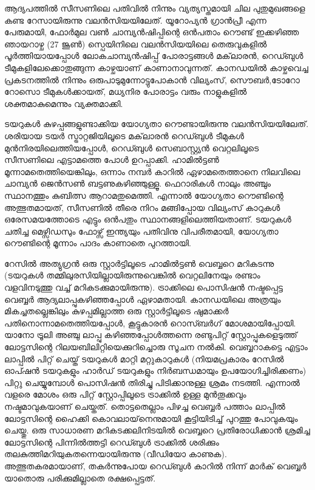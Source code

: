 \vskip 2pt

ആദ്യപത്തില്‍ സീസണിലെ പതിവില്‍ നിന്നും വ്യത്യസ്തമായി ചില പുതുമുഖങ്ങളെ കണ്ട റേസായിരുന്നു വലന്‍സിയയിലേത്. 
യൂറോപ്യന്‍ ഗ്രാന്‍പ്രീ എന്ന പേരുമായി, ഫോര്‍മുല വണ്‍ ചാമ്പ്യന്‍ഷിപ്പിന്റെ ഒന്‍പതാം റൌണ്ട് ഇക്കഴിഞ്ഞ ഞായറാഴ്ച (27
ജൂണ്‍) സ്പെയിനിലെ വലന്‍സിയയിലെ തെരുവുകളില്‍ പൂര്‍ത്തിയായപ്പോള്‍ ലോകചാമ്പ്യന്‍ഷിപ്പ് പോരാട്ടങ്ങള്‍ മക്‌ലാരന്‍,
റെഡ്ബുള്‍ ടീമുകളിലേക്കൊതുങ്ങുന്ന കാഴ്ചയാണ് കാണാനാവുന്നത്. കാനഡയില്‍ കാഴ്ചവെച്ച പ്രകടനത്തില്‍ നിന്നും 
ഒരുപാടുമുന്നോട്ടുപോകാന്‍ വില്യംസ്, സൌബര്‍,ടോറോ റോസൊ ടീമുകള്‍ക്കായത്, മധ്യനിര പോരാട്ടം വരും നാളുകളില്‍
ശക്തമാകുമെന്നും വ്യക്തമാക്കി.

ടയറുകള്‍ കുഴപ്പങ്ങളുണ്ടാക്കിയ യോഗ്യതാ റൌണ്ടായിരുന്നു വലന്‍സിയയിലേത്. ശരിയായ ടയര്‍ സ്ട്രാറ്റജിയിലൂടെ മക്‌ലാരന്‍
റെഡ്ബുള്‍ ടീമുകള്‍ മുന്‍നിരയിലെത്തിയപ്പോള്‍, റെഡ്ബുള്‍ സെബാസ്റ്റ്യന്‍ വെറ്റലിലൂടെ സീസണിലെ എട്ടാമത്തെ പോള്‍ 
ഉറപ്പാക്കി. ഹാമില്‍ട്ടണ്‍ മൂന്നാമതെത്തിയെങ്കിലും, ഒന്നാം നമ്പര്‍ കാറില്‍ ഏഴാമതെത്താനെ നിലവിലെ ചാമ്പ്യന്‍ ജെന്‍സണ്‍
ബട്ടണുകഴിഞ്ഞുള്ളൂ. ഫെറാരികള്‍ നാലും അഞ്ചും സ്ഥാനത്തും കുബിത്സ ആറാമതുമെത്തി. എന്നാല്‍ യോഗ്യതാ റൌണ്ടിന്റെ
അത്ഭുതമായത്, സീസണില്‍ തീരെ നിറം മങ്ങിപ്പോയ വില്യംസ് കാറുകള്‍ ഒരേസമയത്തോടെ എട്ടും ഒന്‍പതും 
സ്ഥാനങ്ങളിലെത്തിയതാണ്. ടയറുകള്‍ ചതിച്ച മെഴ്സിഡസും ഫോഴ്സ് ഇന്ത്യയും പതിവിനു വിപരീതമായി, യോഗ്യതാ റൌണ്ടിന്റെ
മൂന്നാം പാദം കാണാതെ പുറത്തായി.

റേസില്‍ അത്യുഗ്രന്‍ ഒരു സ്റ്റാര്‍ട്ടിലൂടെ ഹാമില്‍ട്ടണ്‍ വെബ്ബറെ മറികടന്നു (ടയറുകള്‍ തമ്മിലുരസിയില്ലായിരുന്നുവെങ്കില്‍ 
വെറ്റലിനേയും രണ്ടാം വളവിനടുത്തു വച്ച് മറികടക്കുമായിരുന്നു). ട്രാക്കിലെ പൊസിഷന്‍ നഷ്ടപ്പെട്ട വെബ്ബര്‍ 
ആദ്യലാപ്പുകഴിഞ്ഞപ്പോള്‍ ഏഴാമതായി. കാനഡയിലെ അത്രയും മികച്ചതല്ലെങ്കിലും കുഴപ്പമില്ലാത്ത ഒരു സ്റ്റാര്‍ട്ടിലൂടെ 
ഷുമാക്കര്‍ പതിനൊന്നാമതെത്തിയപ്പോള്‍, കൂട്ടുകാരന്‍ റൊസ്ബര്‍ഗ് മോശമായിപ്പോയി. യാനോ ട്രൂലി അഞ്ചു ലാപ്പു 
കഴിഞ്ഞപ്പോള്‍ത്തന്നെ രണ്ടുപിറ്റ് സ്റ്റോപ്പുകളെടുത്ത് ലോട്ടസിന്റെ റിലയബിലിറ്റിയെക്കുറിച്ചൊരു സൂചന നല്‍കി. 
വെബ്ബറാകട്ടെ എട്ടാം ലാപ്പില്‍ പിറ്റ് ചെയ്ത് ടയറുകള്‍ മാറ്റി മറ്റുകാറുകള്‍ (നിയമപ്രകാരം റേസില്‍ ഓപ്ഷന്‍ ടയറുകളും 
ഹാര്‍ഡ് ടയറുകളും നിര്‍ബന്ധമായും ഉപയോഗിച്ചിരിക്കണം) പിറ്റു ചെയ്യുമ്പോള്‍ പൊസിഷന്‍ തിരിച്ചു പിടിക്കാനുള്ള ശ്രമം 
നടത്തി. എന്നാല്‍ വളരെ മോശം ഒരു പിറ്റ് സ്റ്റോപ്പിലൂടെ ട്രാക്കില്‍ ഉള്ള മുന്‍തൂക്കവും നഷ്ടമാവുകയാണ് ചെയ്തത്. 
തൊട്ടതെല്ലാം പിഴച്ച വെബ്ബര്‍ പത്താം ലാപ്പില്‍ ലോട്ടസിന്റെ ഹൈക്കി കൊവലായ്‌നെനുമായി കൂട്ടിയിടിച്ച് പുറത്തു 
പോവുകയും ചെയ്തു. ഒരു സാധാരണ മറികടക്കലിനിടയില്‍ വെബ്ബറെ പ്രതിരോധിക്കാന്‍ ശ്രമിച്ച ലോട്ടസിന്റെ പിന്നില്‍ത്തട്ടി 
റെഡ്ബുള്‍ ട്രാക്കില്‍ ശരിക്കും തലകുത്തിമറിയുകതന്നെയായിരുന്നു (വീഡിയോ കാണുക). അത്ഭുതകരമായാണ്, 
തകര്‍ന്നുപോയ റെഡ്ബുള്‍ കാറില്‍ നിന്ന് മാര്‍ക് വെബ്ബര്‍ യാതൊരു പരിക്കുമില്ലാതെ രക്ഷപ്പെട്ടത്.

